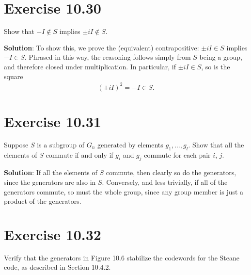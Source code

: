 \documentclass{book}
\begin{document}
\section*{Exercise 10.30}
    Show that $-I \notin S$ implies $\pm i I \notin S$.
    
    \textbf{Solution}: To show this, we prove the (equivalent) contrapositive: $\pm i I \in S$ implies $-I \in S$. Phrased in this way, the reasoning follows simply from $S$ being a group, and therefore closed under multiplication. In particular, if $\pm i I \in S$, so is the square
    \begin{align}
        (\pm i I)^2 = -I \in S.
    \end{align}

\section*{Exercise 10.31}
    Suppose $S$ is a subgroup of $G_n$ generated by elements $g_1,\dots, g_l$. Show that all the elements of $S$ commute if and only if $g_i$ and $g_j$ commute for each pair $i$, $j$.
    
    \textbf{Solution}: If all the elements of $S$ commute, then clearly so do the generators, since the generators are also in $S$. Conversely, and less trivially, if all of the generators commute, so must the whole group, since any group member is just a product of the generators.
    
\section*{Exercise 10.32}
    Verify that the generators in Figure 10.6 stabilize the codewords for the Steane code, as described in Section 10.4.2.
    
\end{document}
